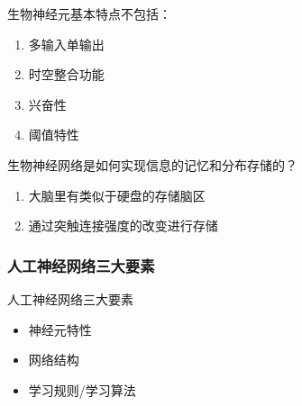 \begin{example}
    生物神经元基本特点不包括：    
    \begin{enumerate}[A]
        \item 多输入单输出
        \item 时空整合功能
        \item \textcolor{main1}{兴奋性}
        \item 阈值特性
    \end{enumerate}
\end{example}
\begin{example}
    生物神经网络是如何实现信息的记忆和分布存储的？ 
    \begin{enumerate}[A]
        \item 大脑里有类似于硬盘的存储脑区
        \item \textcolor{main1}{通过突触连接强度的改变进行存储}
    \end{enumerate}
\end{example}
\subsubsection{人工神经网络三大要素}
\textcolor{main1}{人工神经网络三大要素}
\begin{itemize}
    \item 神经元特性
    \item 网络结构
    \item 学习规则/学习算法
\end{itemize}

